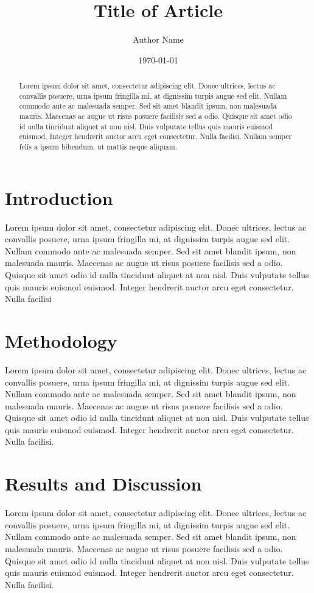 \documentclass[12pt, twoside]{article}
\begin{document}
\title{\textbf{\LARGE Title of Article}}
\author{Author Name}
\date{\today}
\maketitle

\thispagestyle{empty}

\begin{abstract}
Lorem ipsum dolor sit amet, consectetur adipiscing elit. Donec ultrices, lectus ac convallis posuere, urna ipsum fringilla mi, at dignissim turpis augue sed elit. Nullam commodo ante ac malesuada semper. Sed sit amet blandit ipsum, non malesuada mauris. Maecenas ac augue ut risus posuere facilisis sed a odio. Quisque sit amet odio id nulla tincidunt aliquet at non nisl. Duis vulputate tellus quis mauris euismod euismod. Integer hendrerit auctor arcu eget consectetur. Nulla facilisi. Nullam semper felis a ipsum bibendum, ut mattis neque aliquam.
\end{abstract}

\section{Introduction}
Lorem ipsum dolor sit amet, consectetur adipiscing elit. Donec ultrices, lectus ac convallis posuere, urna ipsum fringilla mi, at dignissim turpis augue sed elit. Nullam commodo ante ac malesuada semper. Sed sit amet blandit ipsum, non malesuada mauris. Maecenas ac augue ut risus posuere facilisis sed a odio. Quisque sit amet odio id nulla tincidunt aliquet at non nisl. Duis vulputate tellus quis mauris euismod euismod. Integer hendrerit auctor arcu eget consectetur. Nulla facilisi

\section{Methodology}
Lorem ipsum dolor sit amet, consectetur adipiscing elit. Donec ultrices, lectus ac convallis posuere, urna ipsum fringilla mi, at dignissim turpis augue sed elit. Nullam commodo ante ac malesuada semper. Sed sit amet blandit ipsum, non malesuada mauris. Maecenas ac augue ut risus posuere facilisis sed a odio. Quisque sit amet odio id nulla tincidunt aliquet at non nisl. Duis vulputate tellus quis mauris euismod euismod. Integer hendrerit auctor arcu eget consectetur. Nulla facilisi.

\section{Results and Discussion}
Lorem ipsum dolor sit amet, consectetur adipiscing elit. Donec ultrices, lectus ac convallis posuere, urna ipsum fringilla mi, at dignissim turpis augue sed elit. Nullam commodo ante ac malesuada semper. Sed sit amet blandit ipsum, non malesuada mauris. Maecenas ac augue ut risus posuere facilisis sed a odio. Quisque sit amet odio id nulla tincidunt aliquet at non nisl. Duis vulputate tellus quis mauris euismod euismod. Integer hendrerit auctor arcu eget consectetur. Nulla facilisi.
\end{document}
